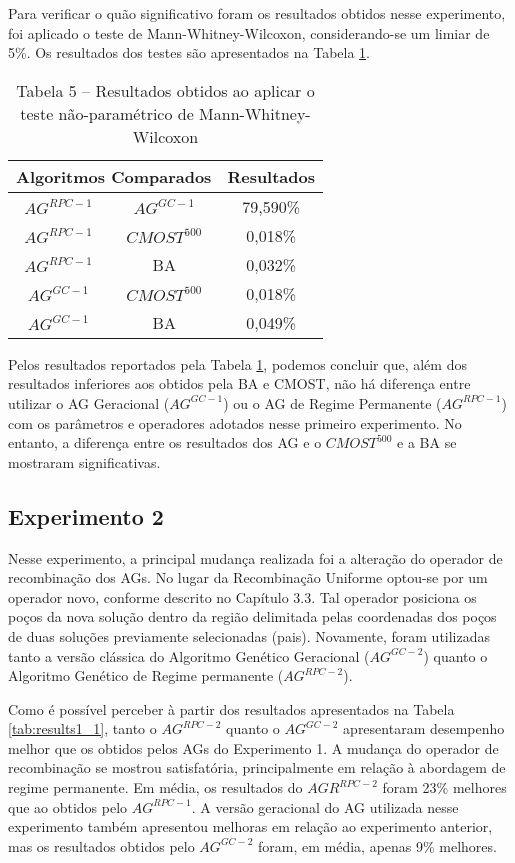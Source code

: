 Para verificar o quão significativo foram os resultados obtidos nesse experimento, foi aplicado o teste de Mann-Whitney-Wilcoxon, considerando-se um limiar de 5\%. Os resultados dos testes são apresentados na Tabela \ref{tab:mw1_1}.

\begin{table}[H]
\centering
\caption{Tabela 5 – Resultados obtidos ao aplicar o teste não-paramétrico de Mann-Whitney-Wilcoxon}
\label{tab:mw1_1}
\begin{tabular}{|c|c|c|}
\hline
\multicolumn{2}{|c|}{Algoritmos Comparados} & Resultados \\ \hline
$AG^{RPC-1}$ &	$AG^{GC-1}$ & 79,590\% \\ \hline
$AG^{RPC-1}$ & $CMOST^500$ & 0,018\% \\ \hline
$AG^{RPC-1}$ & BA & 0,032\% \\ \hline
$AG^{GC-1}$ & $CMOST^500$ & 0,018\% \\ \hline
$AG^{GC-1}$ & BA & 0,049\% \\ \hline

\end{tabular}
\end{table}

Pelos resultados reportados pela Tabela \ref{tab:mw1_1}, podemos concluir que, além dos resultados inferiores aos obtidos pela BA e CMOST, não há diferença entre utilizar o AG Geracional ($AG^{GC-1}$) ou o AG de Regime Permanente ($AG^{RPC-1}$) com os parâmetros e operadores adotados nesse primeiro experimento. No entanto, a diferença entre os resultados dos AG e o $CMOST^{500}$ e a BA se mostraram  significativas.

\subsection{Experimento 2}

Nesse experimento, a principal mudança realizada foi a alteração do operador de recombinação dos AGs. No lugar da Recombinação Uniforme optou-se por um operador novo, conforme descrito no Capítulo 3.3. Tal operador posiciona os poços da nova solução dentro da região delimitada pelas coordenadas dos poços de duas soluções previamente selecionadas (pais). Novamente, foram utilizadas tanto a versão clássica do Algoritmo Genético Geracional ($AG^{GC-2}$) quanto o Algoritmo Genético de Regime permanente ($AG^{RPC-2}$).

Como é possível perceber à partir dos resultados apresentados na Tabela \ref{tab:results1_1}, tanto o $AG^{RPC-2}$ quanto o $AG^{GC-2}$ apresentaram desempenho melhor que os obtidos pelos AGs do Experimento 1. A mudança do operador de recombinação se mostrou satisfatória, principalmente em relação à abordagem de regime permanente. Em média, os resultados do $AGR^{RPC-2}$ foram 23\% melhores que ao obtidos pelo $AG^{RPC-1}$. A versão geracional do AG utilizada nesse experimento também apresentou melhoras em relação ao experimento anterior, mas os resultados obtidos pelo $AG^{GC-2}$ foram, em média, apenas 9\% melhores.

